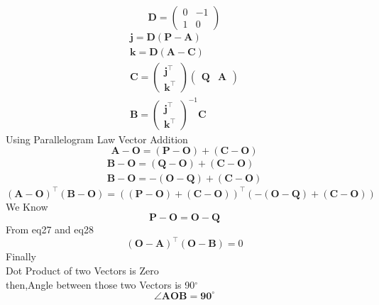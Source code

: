 \documentclass[journal,10pt,twocolumn]{article}
\let\vec\mathbf
\newcommand{\myvec}[1]{\ensuremath{\begin{pmatrix}#1\end{pmatrix}}}
\begin{document}
{\begin{equation}
	\vec{D}=\myvec{0&-1\\1&0}
	\end{equation}
\begin{eqnarray}
	\vec{j} = \vec{D}(\vec{P-A})\\
	\vec{k} =\vec{D}(\vec{A-C})\\
	\vec{C}=\myvec{\vec{j^\top}\\\vec{k^\top}}\myvec{\vec{Q} & \vec{A}}\\
	\vec{B}=\myvec{\vec{j^\top}\\\vec{k^\top}}^{-1}\vec{C}
\end{eqnarray}
Using Parallelogram Law Vector Addition
\begin{equation}
	\vec{A-O}=(\vec{P-O})+(\vec{C-O})    
\end{equation}
\begin{eqnarray}
	\vec{B-O}=(\vec{Q-O})+(\vec{C-O})\\
	\vec{B-O}=-(\vec{O-Q})+(\vec{C-O})
\end{eqnarray}
\begin{equation}
	(\vec{A-O})^\top(\vec{B-O})=((\vec{P-O})+(\vec{C-O}))^\top(-(\vec{O-Q})+(\vec{C-O}))
\end{equation}
We Know
\begin{equation}
    \vec{P-O}=\vec{O-Q}
\end{equation}
From eq27 and eq28
\begin{equation}
	(\vec{O-A})^\top(\vec{O-B})=0
\end{equation}
Finally\\
Dot Product of two  Vectors is Zero\\
then,Angle between those two Vectors is  90$^{\circ}$
\begin{equation}
    \angle{\boldsymbol{AOB}}=\boldsymbol{ 90^{\circ}}
\end{equation}
}
\end{document}
